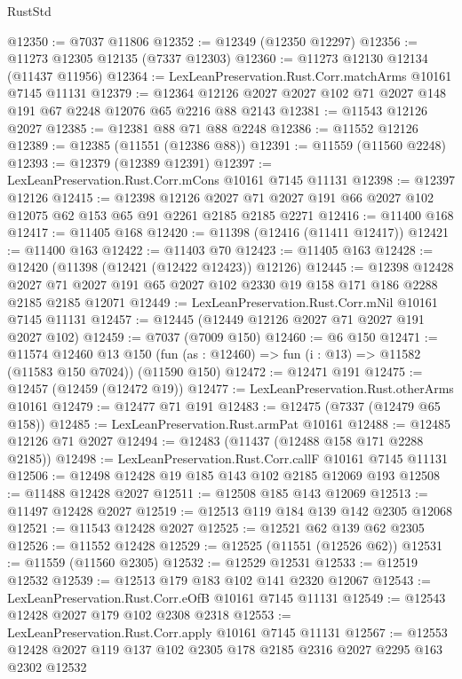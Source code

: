 \begin{lexlean}{RustStd}
\begin{coremodule}
@12350 := @7037 @11806
@12352 := @12349 (@12350 @12297)
@12356 := @11273 @12305 @12135 (@7337 @12303)
@12360 := @11273 @12130 @12134 (@11437 @11956)
@12364 := LexLeanPreservation.Rust.Corr.matchArms @10161 @7145 @11131
@12379 := @12364 @12126 @2027 @2027 @102 @71 @2027 @148 @191 @67 @2248 @12076 @65 @2216 @88 @2143
@12381 := @11543 @12126 @2027
@12385 := @12381 @88 @71 @88 @2248
@12386 := @11552 @12126
@12389 := @12385 (@11551 (@12386 @88))
@12391 := @11559 (@11560 @2248)
@12393 := @12379 (@12389 @12391)
@12397 := LexLeanPreservation.Rust.Corr.mCons @10161 @7145 @11131
@12398 := @12397 @12126
@12415 := @12398
    @12126
    @2027
    @71
    @2027
    @191
    @66
    @2027
    @102
    @12075
    @62
    @153
    @65
    @91
    @2261
    @2185
    @2185
    @2271
@12416 := @11400 @168
@12417 := @11405 @168
@12420 := @11398 (@12416 (@11411 @12417))
@12421 := @11400 @163
@12422 := @11403 @70
@12423 := @11405 @163
@12428 := @12420 (@11398 (@12421 (@12422 @12423)) @12126)
@12445 := @12398
    @12428
    @2027
    @71
    @2027
    @191
    @65
    @2027
    @102
    @2330
    @19
    @158
    @171
    @186
    @2288
    @2185
    @2185
    @12071
@12449 := LexLeanPreservation.Rust.Corr.mNil @10161 @7145 @11131
@12457 := @12445 (@12449 @12126 @2027 @71 @2027 @191 @2027 @102)
@12459 := @7037 (@7009 @150)
@12460 := @6 @150
@12471 := @11574
    @12460
    @13
    @150
    (fun (as : @12460) => fun (i : @13) => @11582 (@11583 @150 @7024))
    (@11590 @150)
@12472 := @12471 @191
@12475 := @12457 (@12459 (@12472 @19))
@12477 := LexLeanPreservation.Rust.otherArms @10161
@12479 := @12477 @71 @191
@12483 := @12475 (@7337 (@12479 @65 @158))
@12485 := LexLeanPreservation.Rust.armPat @10161
@12488 := @12485 @12126 @71 @2027
@12494 := @12483 (@11437 (@12488 @158 @171 @2288 @2185))
@12498 := LexLeanPreservation.Rust.Corr.callF @10161 @7145 @11131
@12506 := @12498 @12428 @19 @185 @143 @102 @2185 @12069 @193
@12508 := @11488 @12428 @2027
@12511 := @12508 @185 @143 @12069
@12513 := @11497 @12428 @2027
@12519 := @12513 @119 @184 @139 @142 @2305 @12068
@12521 := @11543 @12428 @2027
@12525 := @12521 @62 @139 @62 @2305
@12526 := @11552 @12428
@12529 := @12525 (@11551 (@12526 @62))
@12531 := @11559 (@11560 @2305)
@12532 := @12529 @12531
@12533 := @12519 @12532
@12539 := @12513 @179 @183 @102 @141 @2320 @12067
@12543 := LexLeanPreservation.Rust.Corr.eOfB @10161 @7145 @11131
@12549 := @12543 @12428 @2027 @179 @102 @2308 @2318
@12553 := LexLeanPreservation.Rust.Corr.apply @10161 @7145 @11131
@12567 := @12553 @12428 @2027 @119 @137 @102 @2305 @178 @2185 @2316 @2027 @2295 @163 @2302 @12532

\end{coremodule}
\end{lexlean}
